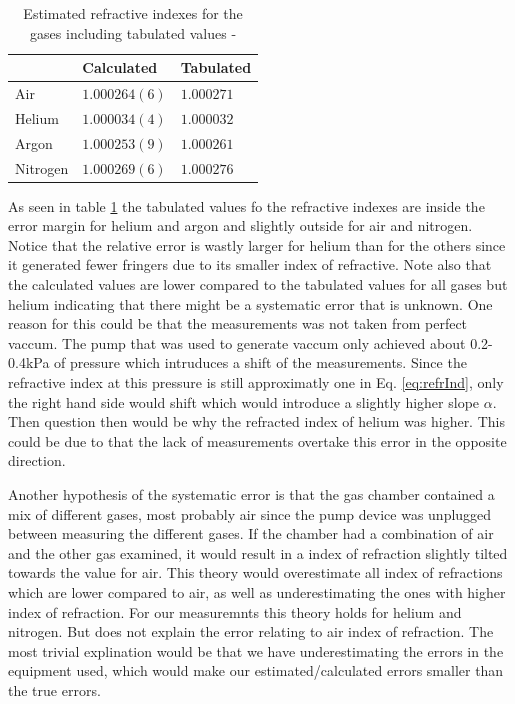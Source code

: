 \begin{table}[H]
  \centering
  \caption{Estimated refractive indexes for the gases including tabulated values \cite{idxAir}-\cite{idxNit}}
  \label{tab:refrIndex}
  \begin{tabular}{l|l|l}%
          & Calculated & Tabulated  \\ \hline %
    Air      & $1.000264(6)$  & $1.000271$  \\ %
    Helium   & $1.000034(4)$  & $1.000032$  \\ %
    Argon    & $1.000253(9)$  & $1.000261$  \\ %
    Nitrogen & $1.000269(6)$  & $1.000276$  \\ %
  \end{tabular}
\end{table}

As seen in table \ref{tab:refrIndex} the tabulated values fo the refractive indexes are inside the error margin for helium and argon and slightly outside for air and nitrogen. Notice that the relative error is wastly larger for helium than for the others since it generated fewer fringers due to its smaller index of refractive. Note also that the calculated values are lower compared to the tabulated values for all gases but helium indicating that there might be a systematic error that is unknown. One reason for this could be that the measurements was not taken from perfect vaccum. The pump that was used to generate vaccum only achieved about 0.2-0.4kPa of pressure which intruduces a shift of the measurements. Since the refractive index at this pressure is still approximatly one in Eq. \ref{eq:refrInd}, only the right hand side would shift which would introduce a slightly higher slope $\alpha$. Then question then would be why the refracted index of helium was higher. This could be due to that the lack of measurements overtake this error in the opposite direction.

Another hypothesis of the systematic error is that the gas chamber contained a mix of different gases, most probably air since the pump device was unplugged between measuring the different gases. If the chamber had a combination of air and the other gas examined, it would result in a index of refraction slightly tilted towards the value for air. This theory would overestimate all index of refractions which are lower compared to air, as well as underestimating the ones with higher index of refraction. For our measuremnts this theory holds for helium and nitrogen. But does not explain the error relating to air index of refraction. The most trivial explination would be that we have underestimating the errors in the equipment used, which would make our estimated/calculated errors smaller than the true errors.



